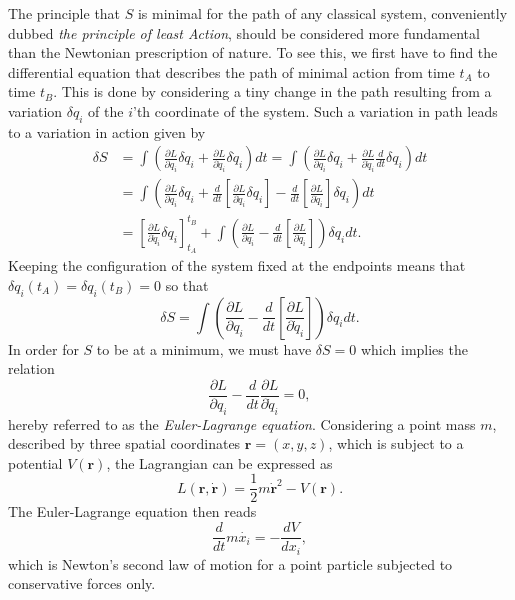 \documentclass[twoside,utf8]{article}
\begin{document}
The principle that $S$ is minimal for the path of any classical system, conveniently dubbed {\it the principle of least Action}, should be considered more fundamental than the Newtonian prescription of nature. To see this, we first have to find the differential equation that describes the path of minimal action from time $t_A$ to time $t_B$. This is done by considering a tiny change in the path resulting from a variation $\delta q_i$ of the $i$'th coordinate of the system. Such a variation in path leads to a variation in action given by
\begin{equation*}
\begin{aligned}
\delta S
&= \int
\left(
\frac{\partial L}{\partial q_i}\delta q_i
+
\frac{\partial L}{\partial \dot{q}_i}\delta \dot{q}_i
\right)dt
= \int
\left(
\frac{\partial L}{\partial q_i}\delta q_i
+
\frac{\partial L}{\partial \dot{q}_i}\frac{d}{dt}\delta q_i
\right)dt \\
&=\int
\left(
\frac{\partial L}{\partial q_i}\delta q_i
+
\frac{d}{dt}\left[\frac{\partial L}{\partial \dot{q}_i}  \delta q_i \right]
-
\frac{d}{dt}\left[\frac{\partial L}{\partial \dot{q}_i} \right] \delta q_i
\right)dt \\
&=
\left[\frac{\partial L}{\partial \dot{q}_i}  \delta q_i \right]_{t_A}^{t_B}
+
\int
\left(
\frac{\partial L}{\partial q_i}
-
\frac{d}{dt}\left[\frac{\partial L}{\partial \dot{q}_i} \right]
\right) \delta q_idt.
\end{aligned}
\end{equation*}
Keeping the configuration of the system fixed at the endpoints means that $\delta q_i(t_A)=\delta q_i(t_B)=0$ so that
\[
\delta S = \int
\left(
\frac{\partial L}{\partial q_i}
-
\frac{d}{dt}\left[\frac{\partial L}{\partial \dot{q}_i} \right]
\right) \delta q_idt.
\]
In order for $S$ to be at a minimum, we must have $\delta S = 0$ which implies the relation
\[
\frac{\partial L}{\partial q_i}
-
\frac{d}{dt}\frac{\partial L}{\partial \dot{q}_i} = 0,
\]
hereby referred to as the {\it Euler-Lagrange equation}.
Considering a point mass $m$, described by three spatial coordinates $\mathbf{r}=(x,y,z)$, which is subject to a potential $V(\mathbf{r})$, the Lagrangian can be expressed as
\[
L(\mathbf{r},\dot{\mathbf{r}})=\frac{1}{2}m\dot{\mathbf{r}}^2-V(\mathbf{r}).
\]
The Euler-Lagrange equation then reads
\[
\frac{d}{dt}m\dot{x_i}=-\frac{dV}{dx_i},
\]
which is Newton's second law of motion for a point particle subjected to conservative forces only.

\end{document}
